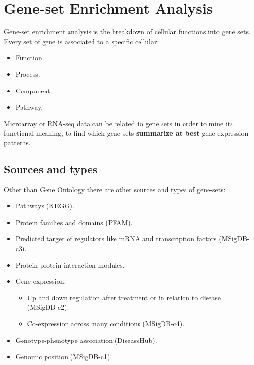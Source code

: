 \section{Gene-set Enrichment Analysis}\label{sec:genesets}
	Gene-set enrichment analysis is the breakdown of cellular functions into gene sets.
	Every set of gene is associated to a specific cellular:

	\begin{multicols}{4}
		\begin{itemize}
			\item Function.
			\item Process.
			\item Component.
			\item Pathway.
		\end{itemize}
	\end{multicols}

	Microarray or RNA-seq data can be related to gene sets in order to mine its functional meaning, to find which gene-sets \textbf{summarize at best} gene expression patterns.

	\subsection{Sources and types}
	Other than Gene Ontology there are other sources and types of gene-sets:

		\begin{itemize}
			\item Pathways (KEGG).
			\item Protein families and domains (PFAM).
			\item Predicted target of regulators like mRNA and transcription factors (MSigDB-c3).
			\item Protein-protein interaction modules.
			\item Gene expression:

				\begin{itemize}
					\item Up and down regulation after treatment or in relation to disease (MSigDB-c2).
					\item Co-expression across many conditions (MSigDB-c4).
				\end{itemize}

			\item Genotype-phenotype association (DiseaseHub).
			\item Genomic position (MSigDB-c1).
		\end{itemize}

